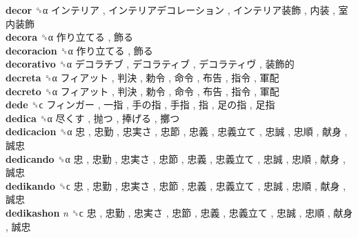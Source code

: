 \textbf{decor} ␝α   インテリア ,  インテリアデコレーション ,  インテリア装飾 ,  内装 ,  室内装飾   \\
\textbf{decora} ␝α   作り立てる ,  飾る   \\
\textbf{decoracion} ␝α   作り立てる ,  飾る   \\
\textbf{decorativo} ␝α   デコラチブ ,  デコラティブ ,  デコラティヴ ,  装飾的   \\
\textbf{decreta} ␝α   フィアット ,  判決 ,  勅令 ,  命令 ,  布告 ,  指令 ,  軍配   \\
\textbf{decreto} ␝α   フィアット ,  判決 ,  勅令 ,  命令 ,  布告 ,  指令 ,  軍配   \\
\textbf{dede} ␝ϲ   フィンガー ,  一指 ,  手の指 ,  手指 ,  指 ,  足の指 ,  足指   \\
\textbf{dedica} ␝α   尽くす ,  抛つ ,  捧げる ,  擲つ   \\
\textbf{dedicacion} ␝α   忠 ,  忠勤 ,  忠実さ ,  忠節 ,  忠義 ,  忠義立て ,  忠誠 ,  忠順 ,  献身 ,  誠忠   \\
\textbf{dedicando} ␝α   忠 ,  忠勤 ,  忠実さ ,  忠節 ,  忠義 ,  忠義立て ,  忠誠 ,  忠順 ,  献身 ,  誠忠   \\
\textbf{dedikando} ␝ϲ   忠 ,  忠勤 ,  忠実さ ,  忠節 ,  忠義 ,  忠義立て ,  忠誠 ,  忠順 ,  献身 ,  誠忠   \\
\textbf{dedikashon} \emph{n}  ␝ϲ   忠 ,  忠勤 ,  忠実さ ,  忠節 ,  忠義 ,  忠義立て ,  忠誠 ,  忠順 ,  献身 ,  誠忠   \\
